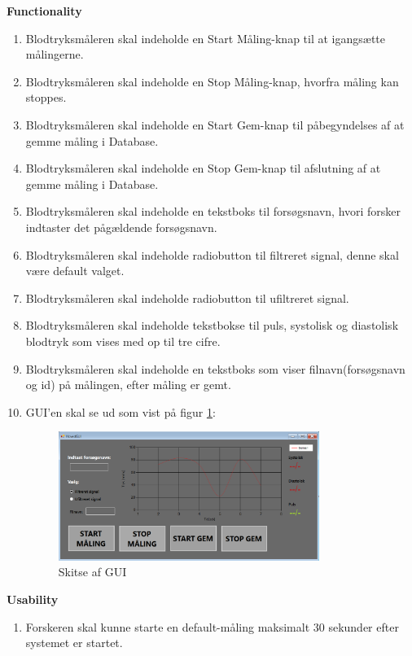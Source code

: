 \textbf{Functionality}
\begin{enumerate}
\item Blodtryksmåleren skal indeholde en Start Måling-knap til at igangsætte målingerne. 
\item Blodtryksmåleren skal indeholde en Stop Måling-knap, hvorfra måling kan stoppes.
\item Blodtryksmåleren skal indeholde en Start Gem-knap til påbegyndelses af at gemme måling i Database.
\item Blodtryksmåleren skal indeholde en Stop Gem-knap til afslutning af at gemme måling i Database. 
\item Blodtryksmåleren skal indeholde en tekstboks til forsøgsnavn, hvori forsker indtaster det pågældende forsøgsnavn.
\item Blodtryksmåleren skal indeholde radiobutton til filtreret signal, denne skal være default valget.
\item Blodtryksmåleren skal indeholde radiobutton til ufiltreret signal.
\item Blodtryksmåleren skal indeholde tekstbokse til puls, systolisk og diastolisk blodtryk som vises med op til tre cifre.
\item Blodtryksmåleren skal indeholde en tekstboks som viser filnavn(forsøgsnavn og id) på målingen, efter måling er gemt. 
\item GUI’en skal se ud som vist på figur \ref{fig:Skitse af GUI}:
\begin{figure}[H]
	\centering
	\includegraphics[width=0.8\textwidth]{Figurer/HovedGUI}
	\caption{Skitse af GUI}
	\label{fig:Skitse af GUI}
\end{figure}

\end{enumerate}

\textbf{Usability}
\begin{enumerate}
\item Forskeren skal kunne starte en default-måling maksimalt 30 sekunder efter systemet er startet.
\end{enumerate}


